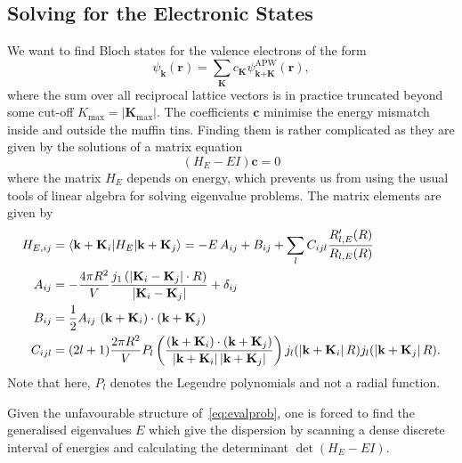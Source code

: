 \documentclass[a4paper,DIV=12,english]{scrartcl}
\begin{document}
\subsection{Solving for the Electronic States}
We want to find Bloch states for the valence electrons of the form 
\begin{equation}
    \psi_\textbf{k}(\textbf{r}) = \sum_\textbf{K} c_\textbf{K} \psi^{\text{APW}}_{\textbf{k} + \textbf{K}}(\textbf{r}),
\end{equation}
where the sum over all reciprocal lattice vectors is in practice truncated beyond some cut-off $K_\text{max} = |\textbf{K}_\text{max}|$.
The coefficients $\textbf{c}$ minimise the energy mismatch inside and outside the muffin tins. Finding them is rather complicated as they are given by the solutions of a matrix equation 
\begin{equation}\label{eq:evalprob}
    (H_E - EI)\textbf{c} = 0
\end{equation}
where the matrix $H_E$ depends on energy, which prevents us from using the usual tools of linear algebra for solving eigenvalue problems. The matrix elements are given by~\cite{Thijssen2007cp}
\begin{align}
    H_{E,ij} &= \braket{\textbf{k}+\textbf{K}_i|H_E|\textbf{k}+\textbf{K}_j} = -E\,A_{ij} + B_{ij} + \sum_l C_{ijl} \frac{R'_{l, E}(R)}{R_{l, E}(R)} \\
    A_{ij} &= -\frac{4\pi R^2}{V} \frac{j_1\left( \left|\textbf{K}_i - \textbf{K}_j\right|\cdot R \right)}{\left|\textbf{K}_i - \textbf{K}_j\right|} + \delta_{ij} \\
    B_{ij} &= \frac{1}{2}A_{ij}\, \left(\textbf{k}+\textbf{K}_i\right) \cdot \left(\textbf{k}+\textbf{K}_j\right) \\
    C_{ijl} &= (2l+1)\frac{2\pi R^2}{V} P_l\left(\frac{\left(\textbf{k}+\textbf{K}_i\right) \cdot \left(\textbf{k}+\textbf{K}_j\right)}{\left|\textbf{k}+\textbf{K}_i\right| \left|\textbf{k}+\textbf{K}_j\right|}\right) j_l(\left|\textbf{k}+\textbf{K}_i\right|R) j_l(\left|\textbf{k}+\textbf{K}_j\right|R).
\end{align}
Note that here, $P_l$ denotes the Legendre polynomials and not a radial function.

Given the unfavourable structure of~\eqref{eq:evalprob}, one is forced to find the generalised eigenvalues $E$ which give the dispersion by scanning a dense discrete interval of energies and calculating the determinant $\det\left(H_E - EI\right)$.
\end{document}
